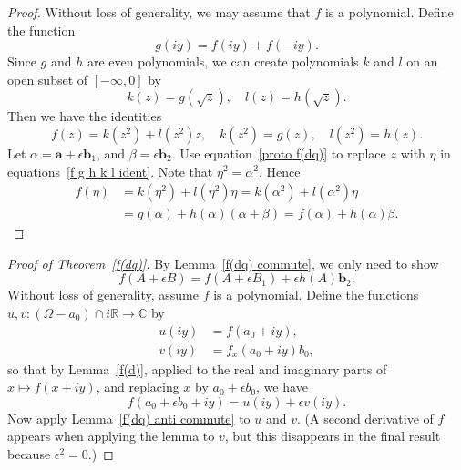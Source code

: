 \documentclass[12pt,reqno]{amsart}
\begin{document}
\begin{proof}  Without loss of generality, we may assume that $f$ is a polynomial.  Define the function
\begin{equation}
g(iy) = f(iy) + f(-iy) .
\end{equation}
Since $g$ and $h$ are even polynomials, we can create polynomials $k$ and $l$ on an open subset of $[-\infty,0]$ by
\begin{equation}
k(z) = g(\sqrt z), \quad l(z) = h(\sqrt z) .
\end{equation}
Then we have the identities
\begin{equation}
\label{f g h k l ident}
f(z) = k(z^2) + l(z^2) z , \quad k(z^2) = g(z), \quad l(z^2) = h(z) .
\end{equation}
Let $\alpha = \bm a + \epsilon \bm b_1$, and $\beta = \epsilon\bm b_2$.  Use equation~\eqref{proto f(dq)} to replace $z$ with $\eta$ in equations~\eqref{f g h k l ident}.  Note that $\eta^2 = \alpha^2$.  Hence
\begin{equation}
\begin{aligned}
f(\eta)
&= k(\eta^2) + l(\eta^2) \eta = k(\alpha^2) + l(\alpha^2) \eta \\
&= g(\alpha) + h(\alpha) (\alpha + \beta) = f(\alpha) + h(\alpha) \beta.
\end{aligned}
\end{equation}
\end{proof}

\begin{proof}[Proof of Theorem~\ref{f(dq)}]
By Lemma~\ref{f(dq) commute}, we only need to show
\begin{equation}
f(A+\epsilon B) = f(A + \epsilon B_1) + \epsilon h(A) \bm b_2 .
\end{equation}
Without loss of generality, assume $f$ is a polynomial.  Define the functions $u,v:(\Omega-a_0) \cap i\mathbb R \to \mathbb C$ by
\begin{align}
u(iy) &= f(a_0 + iy) , \\
v(iy) &= f_{x}(a_0 + iy) b_0,
\end{align}
so that by Lemma~\ref{f(d)}, applied to the real and imaginary parts of $x \mapsto f(x + iy)$, and replacing $x$ by $a_0 + \epsilon b_0$, we have
\begin{equation}
f(a_0 + \epsilon b_0 + i y) = u(iy) + \epsilon v(iy) .
\end{equation}
Now apply Lemma~\ref{f(dq) anti commute} to $u$ and $v$.  (A second derivative of $f$ appears when applying the lemma to $v$, but this disappears in the final result because $\epsilon^2 = 0$.)
\end{proof}
\end{document}
